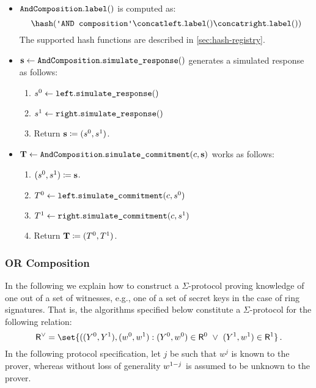 \documentclass[11pt]{article}
\begin{document}
\begin{itemize}
\begin{enumerate}
    \end{enumerate}
  \item  $\texttt{AndComposition}.\texttt{label}()$ is computed as:
    \[
     \hash(\andlabel \concat \leftbranch.\labeltt() \concat \rightbranch.\labeltt())
   \]
   The supported hash functions are described in \cref{sec:hash-registry}.
  \item
  $\mathbf {s} \gets \texttt{AndComposition}.\texttt{simulate\_response}()$
   generates a simulated response as follows:
    \begin{enumerate}
      \item
        $s^0\gets\texttt{left}.\texttt{simulate\_response}()$
        \item $s^1\gets\texttt{right}.\texttt{simulate\_response}()$
      \item
        Return $\mathbf {s}\coloneqq(s^0,s^1)$.
    \end{enumerate}
  \item
  $\mathbf {T} \gets \texttt{AndComposition}.\texttt{simulate\_commitment}(c, \mathbf {s})$ works as follows:
    \begin{enumerate}
      \item
        $(s^0,s^1)\coloneqq\mathbf{s}$.
      \item
        $T^0\gets\texttt{left}.\texttt{simulate\_commitment}(c,s^0)$
        \item $T^1\gets\texttt{right}.\texttt{simulate\_commitment}(c,s^1)$
      \item
        Return $\mathbf {T}\coloneqq(T^0, T^1)$.
      \end{enumerate}
\end{itemize}



\subsubsection{OR Composition}
  In the following we explain how to construct a $\Sigma$-protocol proving knowledge of one out of a set of witnesses, e.g., one of a set of secret keys in the case of ring signatures.
  That is, the algorithms specified below constitute a $\Sigma$-protocol for the following relation:
\[
  \relation^\lor = \set{
    ((\statement^0,\statement^1),(\witness^0,\witness^1) :
    (\statement^0,\witness^0)\in \relation^0 ~\lor~ (\statement^1,\witness^1)\in\relation^1}\,.
\]
  In the following protocol specification, let $j$ be such that $w^j$ is known to the prover, whereas without loss of generality $w^{1-j}$ is assumed to be unknown to the prover.
\end{document}
